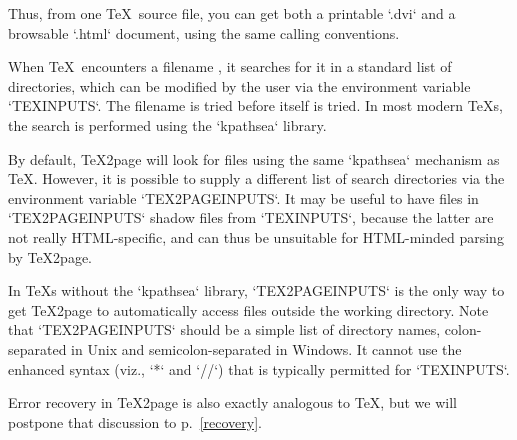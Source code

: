 Thus, from one \TeX\ source file, you can get both a printable `.dvi` and a
browsable `.html` document, using the same calling
conventions.\iffalse ifx\inpltdist\undefined\f{Quite a few documents profit from
being available additionally as plain text, either as a man page, or as
tagged text on a general-purpose text editor, instead of requiring an HTML
browser.  The scripts `t2p2man`,
`t2p2txt`, and `t2p2info`, included in the \TeX2page distribution,
help accomplish this.
Each of these scripts takes as argument the main HTML
file \p{|meta[jobname].html} created by \TeX2page, and generate the
corresponding man page \p{|meta[jobname].1},
the Vim help file \p{|meta[jobname].txt}, and the
Info file
\p{|meta[jobname].info}
respectively.  While the man page is always a single page, the Info and
Vim-help output is composed of multiple files if the HTML document contains
pagebreaks.}\fi



When \TeX\ encounters a filename , it
searches for it
in a standard list of
directories, which can be modified by the user via the
environment variable `TEXINPUTS`.
The filename  is tried before
 itself is tried.  In most modern \TeX s, the
search is performed using the `kpathsea` library.

By default, \TeX2page will look for files using the same `kpathsea`
mechanism as \TeX.  However, it is possible to supply a
different list of search directories via the environment
variable `TEX2PAGEINPUTS`.
It may be useful to have
files in `TEX2PAGEINPUTS` shadow files from
`TEXINPUTS`, because the latter are not really
HTML-specific, and can thus be unsuitable for
HTML-minded parsing by \TeX2page.

In \TeX s without the `kpathsea` library,
`TEX2PAGEINPUTS` is the only way to get \TeX2page to
automatically access files outside the working
directory.  Note that `TEX2PAGEINPUTS` should be a
simple list of directory names, colon-separated in Unix
and semicolon-separated in Windows.  It cannot use the
enhanced syntax (viz., `*` and `//`) that is
typically permitted for `TEXINPUTS`.

%
Error recovery in \TeX2page is also exactly analogous to
\TeX, but we will postpone that discussion to
p.~\ref{recovery}.

